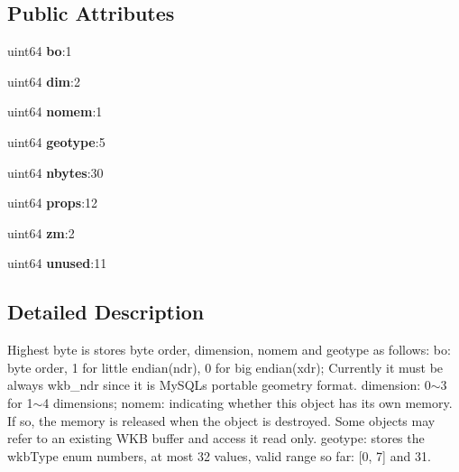 \subsection*{Public Attributes}
\begin{DoxyCompactItemize}
\item 
\mbox{\label{classGeometry_1_1Flags__t_a2fc7d0da7a1a647b1638554632a1db12}} 
uint64 {\bfseries bo}\+:1
\item 
\mbox{\label{classGeometry_1_1Flags__t_a28e7446b130e112011fd4e4a75a20831}} 
uint64 {\bfseries dim}\+:2
\item 
\mbox{\label{classGeometry_1_1Flags__t_a210e7dbf2447a85feb55c3fb688190f5}} 
uint64 {\bfseries nomem}\+:1
\item 
\mbox{\label{classGeometry_1_1Flags__t_afbe4385203ae8860dfaf706870a23fde}} 
uint64 {\bfseries geotype}\+:5
\item 
\mbox{\label{classGeometry_1_1Flags__t_a74c08b3441c93ea3ba987f3abec32516}} 
uint64 {\bfseries nbytes}\+:30
\item 
\mbox{\label{classGeometry_1_1Flags__t_a7d2c07166a95d2265a30ef53cd87b789}} 
uint64 {\bfseries props}\+:12
\item 
\mbox{\label{classGeometry_1_1Flags__t_a28ac482aaf3f30ef2e5e6ea4b5d79a93}} 
uint64 {\bfseries zm}\+:2
\item 
\mbox{\label{classGeometry_1_1Flags__t_a9413b83407f328769922afcb1e15474f}} 
uint64 {\bfseries unused}\+:11
\end{DoxyCompactItemize}


\subsection{Detailed Description}
Highest byte is stores byte order, dimension, nomem and geotype as follows\+: bo\+: byte order, 1 for little endian(ndr), 0 for big endian(xdr); Currently it must be always wkb\+\_\+ndr since it is My\+S\+QL\textquotesingle{}s portable geometry format. dimension\+: 0$\sim$3 for 1$\sim$4 dimensions; nomem\+: indicating whether this object has its own memory. If so, the memory is released when the object is destroyed. Some objects may refer to an existing W\+KB buffer and access it read only. geotype\+: stores the wkb\+Type enum numbers, at most 32 values, valid range so far\+: \mbox{[}0, 7\mbox{]} and 31.


